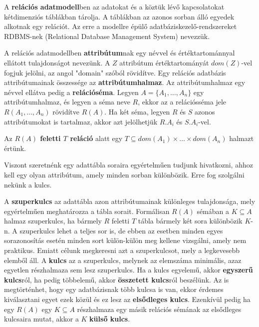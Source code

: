 \begin{defi}
A \textbf{relációs adatmodell}ben az adatokat és a köztük lévő kapcsolatokat kétdimenziós táblákban tárolja. A táblákban az azonos sorban álló egyedek alkotnak egy relációt. Az erre a modellre épülő adatbáziskezelő-rendszereket RDBMS-nek (Relational Database Management System) nevezzük.
\end{defi}

\begin{defi}
A relációs adatmodellben \textbf{attribútum}nak egy névvel és értéktartománnyal ellátott tulajdonságot nevezünk. A $Z$ attribútum értéktartományát $dom(Z)$-vel fogjuk jelölni, az angol "domain" szóból rövidítve. Egy relációs adatbázis attribútumainak összessége az \textbf{attribútumhalmaz}. Az attribútumhalmaz egy névvel ellátva pedig a \textbf{relációséma}. Legyen $A = \{A_1,\ldots,A_n\}$ egy attribútumhalmaz, és legyen a séma neve $R$, ekkor az a relációsséma jele $R(A_1,\ldots,A_n)$ rövidítve $R(A)$. Ha két séma, legyen $R$ és $S$ azonos attribútumokat is tartalmaz, akkor azt jelölhetjük $R.A_i$ és $S.A_i$-vel.
\end{defi}

\begin{defi}
Az \textbf{$R(A)$ feletti $T$ reláció} alatt egy $T \subseteq dom(A_1) \times \ldots \times dom(A_n)$ halmazt értünk.  
\end{defi}

Viszont szeretnénk egy adattábla soraira egyértelműen tudjunk hivatkozni, ahhoz kell egy olyan attribútum, amely minden sorban különbözik. Erre fog szolgálni nekünk a kulcs.

\begin{defi}
A \textbf{szuperkulcs} az adattábla azon attribútumainak különleges tulajdonsága, mely egyértelműen meghatározza a tábla sorait. Formálisan  $R(A)$ sémában a $K \subseteq A$ halmaz szuperkulcs, ha bármely $R$ feletti $T$ tábla bármely két sora különbözik $K$-n. A szuperkulcs lehet a teljes sor is, de ebben az esetben minden egyes sorazonosítás esetén minden sort külön-külön meg kellene vizsgálni, amely nem praktikus. Emiatt célunk megkeresni azt a szuperkulcsot, mely a legkevesebb elemből áll. A \textbf{kulcs} az a szuperkulcs, melynek az elemszáma minimális, azaz egyetlen részhalmaza sem lesz szuperkulcs. Ha a kulcs egyelemű, akkor \textbf{egyszerű kulcs}ról, ha pedig többelemű, akkor \textbf{összetett kulcs}ról beszélünk. Az is megtörténhet, hogy egy adatbázisnak több kulcsa is van, ekkor érdemes kiválasztani egyet ezek közül és ez lesz az \textbf{elsődleges kulcs}. Ezenkívül pedig ha egy $R(A)$ egy $K\subseteq A$ részhalmaza egy másik relációs sémának az elsődleges kulcsaira mutat, akkor a $K$ \textbf{külső kulcs}.
\end{defi}

